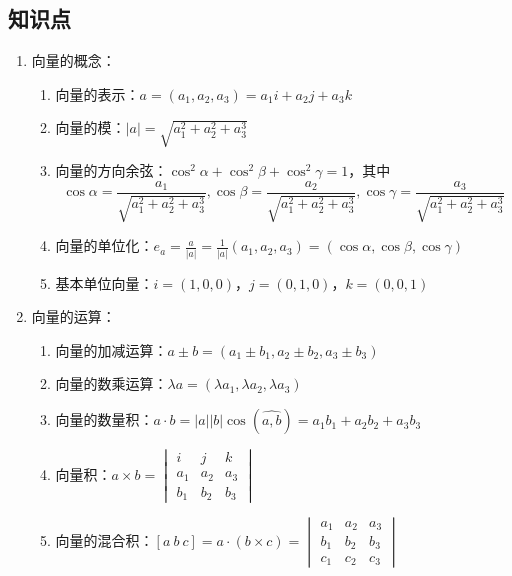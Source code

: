 \documentclass[UTF8]{ctexart}
\theoremstyle{remark}
\begin{document}
\subsection*{知识点}
\begin{enumerate}


\item 向量的概念：
\begin{enumerate}
	\item 向量的表示：\(a=(a_{1}, a_{2}, a_{3})=a_{1}i+a_{2}j+a_{3}k\)
	\item 向量的模：\(|a|=\sqrt{a_{1}^{2}+a_{2}^{2}+a_{3}^{3}}\)
	\item 向量的方向余弦：\(\cos ^{2}\alpha+\cos ^{2}\beta+\cos ^{2}\gamma=1\)，其中 
	\[
	\cos\alpha=\frac{a_{1}}{\sqrt{a_{1}^{2}+a_{2}^{2}+a_{3}^{3}}}, \cos\beta=\frac{a_{2}}{\sqrt{a_{1}^{2}+a_{2}^{2}+a_{3}^{3}}}, \cos\gamma=\frac{a_{3}}{\sqrt{a_{1}^{2}+a_{2}^{2}+a_{3}^{3}}}
	\]
	\item 向量的单位化：\(e_{a}=\frac{a}{|a|}=\frac{1}{|a|}(a_{1}, a_{2}, a_{3})=(\cos\alpha, \cos\beta, \cos\gamma)\)
	\item 基本单位向量：\(i=(1,0,0)\)，\(j=(0,1,0)\)，\(k=(0,0,1)\)
\end{enumerate}

\item 向量的运算：
\begin{enumerate}
	\item 向量的加减运算：\(a\pm b=(a_{1}\pm b_{1}, a_{2}\pm b_{2}, a_{3}\pm b_{3})\)
	\item 向量的数乘运算：\(\lambda a=(\lambda a_{1}, \lambda a_{2}, \lambda a_{3})\)
	\item 向量的数量积：\(a\cdot b=|a||b|\cos(\widehat{a,b})=a_{1}b_{1}+a_{2}b_{2}+a_{3}b_{3}\)
	\item 向量积：\(a\times b=
	\begin{vmatrix}
		i & j & k \\
		a_{1} & a_{2} & a_{3} \\
		b_{1} & b_{2} & b_{3}
	\end{vmatrix}\)
	\item 向量的混合积：\([a\ b\ c]=a\cdot(b\times c)=
	\begin{vmatrix}
		a_{1} & a_{2} & a_{3} \\
		b_{1} & b_{2} & b_{3} \\
		c_{1} & c_{2} & c_{3}
	\end{vmatrix}\)
\end{enumerate}


\end{enumerate}
\end{document}
